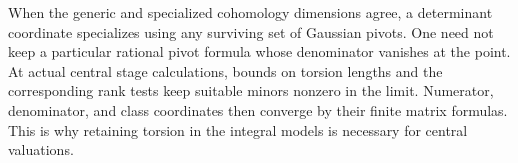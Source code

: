 \begin{remark}\label{models:central-pivots}
When the generic and specialized cohomology dimensions agree, a
determinant coordinate specializes using any surviving set of
Gaussian pivots.  One need not keep a particular rational pivot
formula whose denominator vanishes at the point.  At actual central
stage calculations, bounds on torsion lengths and the corresponding
rank tests keep suitable minors nonzero in the limit.  Numerator,
denominator, and class coordinates then converge by their finite
matrix formulas.  This is why retaining torsion in the integral
models is necessary for central valuations.
\end{remark}
